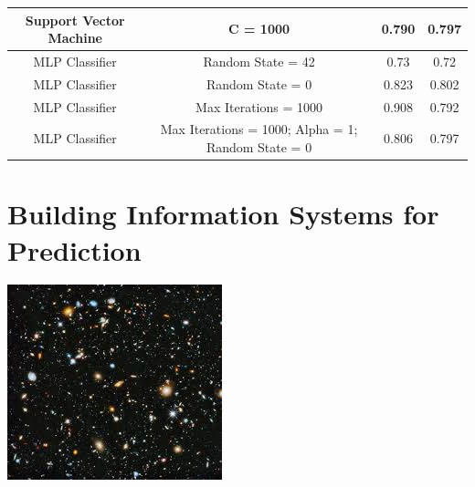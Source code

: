 \documentclass[12pt]{article}
\begin{document}
{\begin{landscape}
\begin{table}[]
\begin{tabular}{|c|c|c|c|}
Support Vector Machine & C = 1000                                           & 0.790              & 0.797             \\ \hline
MLP Classifier         & Random State = 42                                  & 0.73               & 0.72              \\ \hline
MLP Classifier         & Random State = 0                                   & 0.823              & 0.802             \\ \hline
MLP Classifier         & Max Iterations = 1000                              & 0.908              & 0.792             \\ \hline
MLP Classifier         & Max Iterations = 1000; Alpha = 1; Random State = 0 & 0.806              & 0.797             \\ \hline
\end{tabular}
\end{table}
    \end{landscape}
    \clearpage%
}



\newpage
\part{Building Information Systems for Prediction}
\includegraphics[width=\textwidth]{universe}
\end{document}
